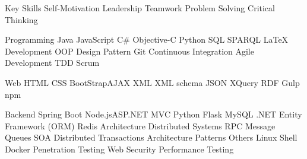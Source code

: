 

\begin{cvskills}

  \cvskill
    {Key Skills} %
    {Self-Motivation \quad Leadership \quad Teamwork \quad Problem Solving \quad Critical Thinking} %
    
  \cvskill
    {Programming} %
    {Java \quad JavaScript \quad C\# \quad Objective-C   \quad Python \quad SQL \quad SPARQL \quad LaTeX} %
  \cvskill
    {Development} %
    {OOP \quad Design Pattern \quad Git \quad Continuous Integration \quad Agile Development \quad TDD \quad Scrum} %

  \cvskill
    {Web} %
    {HTML \quad CSS \quad BootStrap\quad AJAX \quad XML \quad XML schema \quad JSON \quad XQuery \quad  RDF  \quad Gulp \quad npm} %

   \cvskill
    {Backend} %
    {Spring Boot \quad Node.js\quad ASP.NET MVC \quad Python Flask  \quad MySQL \quad  .NET Entity Framework (ORM) \quad  Redis} %
 \cvskill
    {Architecture} %
    {Distributed Systems \quad RPC \quad Message Queues \quad SOA \quad Distributed Transactions  \quad Architecture Patterns   } %
 \cvskill
    {Others} %
    {Linux \quad Shell \quad Docker \quad Penetration Testing \quad Web Security \quad Performance Testing  } %
\end{cvskills}